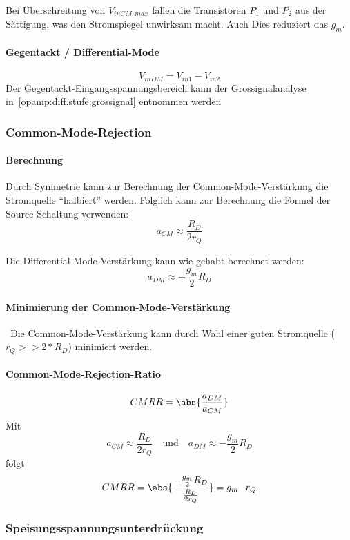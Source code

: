 Bei Überschreitung von $V_{inCM, max}$ fallen die Transistoren $P_1$ und $P_2$ aus der Sättigung, was den Stromspiegel unwirksam macht. Auch Dies reduziert das $g_m$.

\paragraph{Gegentackt / Differential-Mode}
\[
    V_{inDM} = V_{in1} - V_{in2}
\]
Der Gegentackt-Eingangsspannungsbereich kann der Grossignalanalyse in~\ref{opamp:diff.stufe:grossignal} entnommen werden

\subsubsection{Common-Mode-Rejection}
\paragraph{Berechnung}

Durch Symmetrie kann zur Berechnung der Common-Mode-Verstärkung die Stromquelle ``halbiert'' werden.
Folglich kann zur Berechnung die Formel der Source-Schaltung verwenden:
\[
    a_{CM} \approx \frac{R_D}{2 r_Q}
\]

Die Differential-Mode-Verstärkung kann wie gehabt berechnet werden:
\[
    a_{DM} \approx -\frac{g_m}{2} R_D
\]

\paragraph{Minimierung der Common-Mode-Verstärkung}\
Die Common-Mode-Verstärkung kann durch Wahl einer guten Stromquelle ($r_Q >> 2*R_D$) minimiert werden.

\paragraph{Common-Mode-Rejection-Ratio}

\[
    CMRR = \abs{\frac{a_{DM}}{a_{CM}}}
\]
Mit
\[
    a_{CM} \approx \frac{R_D}{2 r_Q} \quad \text{und} \quad
    a_{DM} \approx -\frac{g_m}{2} R_D
\]
folgt
\[
    CMRR = \abs{\frac{-\frac{g_m}{2} R_D}{\frac{R_D}{2 r_Q}}} = g_m \cdot r_Q
\]

\subsubsection{Speisungsspannungsunterdrückung}

